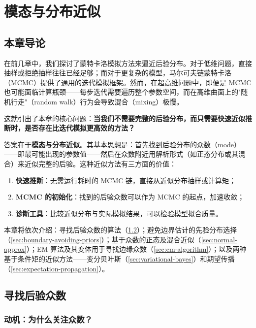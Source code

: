 
\chapter{模态与分布近似}

\section{本章导论}

在前几章中，我们探讨了蒙特卡洛模拟方法来逼近后验分布。对于低维问题，直接抽样或拒绝抽样往往已经足够；而对于更复杂的模型，马尔可夫链蒙特卡洛（MCMC）提供了通用的迭代模拟框架。然而，在超高维问题中，即便是 MCMC 也可能面临计算瓶颈——每步迭代需要遍历整个参数空间，而在高维曲面上的"随机行走"（random walk）行为会导致混合（mixing）极慢。

这就引出了本章的核心问题：\textbf{当我们不需要完整的后验分布，而只需要快速近似推断时，是否存在比迭代模拟更高效的方法？}

答案在于\textbf{模态与分布近似}。其基本思想是：首先找到后验分布的众数（mode）——即最可能出现的参数值——然后在众数附近用解析形式（如正态分布或其混合）来近似完整的后验。这种近似方法有三方面的价值：

\begin{enumerate}
\item \textbf{快速推断}：无需运行耗时的 MCMC 链，直接从近似分布抽样或计算矩；
\item \textbf{MCMC 的初始化}：找到的后验众数可以作为 MCMC 的起点，加速收敛；
\item \textbf{诊断工具}：比较近似分布与实际模拟结果，可以检验模型拟合质量。
\end{enumerate}

本章将依次介绍：寻找后验众数的算法（\cref{sec:finding-posterior-modes}）；避免边界估计的先验分布选择（\cref{sec:boundary-avoiding-priors}）；基于众数的正态及混合近似（\cref{sec:normal-approx}）；EM 算法及其变体用于寻找边缘众数（\cref{sec:em-algorithm}）；以及两种基于条件矩的近似方法——变分贝叶斯（\cref{sec:variational-bayes}）和期望传播（\cref{sec:expectation-propagation}）。

\section{寻找后验众数}\label{sec:finding-posterior-modes}

\subsection{动机：为什么关注众数？}


